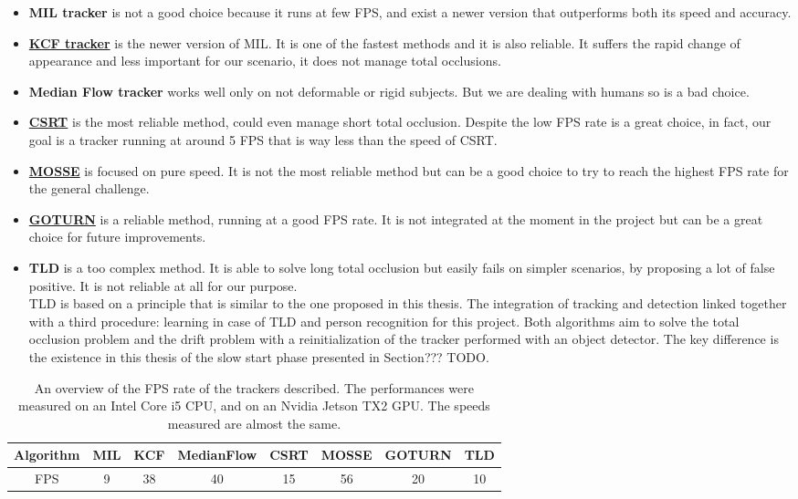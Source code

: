 \begin{itemize}
	\item \textbf{MIL tracker} is not a good choice because it runs at few FPS, and exist a newer version that outperforms both its speed and accuracy.
	\item \underline{\textbf{KCF tracker}} is the newer version of MIL. It is one of the fastest methods and it is also reliable. It suffers the rapid change of appearance and less important for our scenario, it does not manage total occlusions.
	\item \textbf{Median Flow tracker} works well only on not deformable or rigid subjects. But we are dealing with humans so is a bad choice.
	\item \underline{\textbf{CSRT}} is the most reliable method, could even manage short total occlusion. Despite the low FPS rate is a great choice, in fact, our goal is a tracker running at around 5 FPS that is way less than the speed of CSRT.
	\item \underline{\textbf{MOSSE}} is focused on pure speed. It is not the most reliable method but can be a good choice to try to reach the highest FPS rate for the general challenge.
	\item \underline{\textbf{GOTURN}} is a reliable method, running at a good FPS rate. It is not integrated at the moment in the project but can be a great choice for future improvements.
	\item \textbf{TLD} is a too complex method. It is able to solve long total occlusion but easily fails on simpler scenarios, by proposing a lot of false positive. It is not reliable at all for our purpose.\\
	TLD is based on a principle that is similar to the one proposed in this thesis. The integration of tracking and detection linked together with a third procedure: learning in case of TLD and person recognition for this project. Both algorithms aim to solve the total occlusion problem and the drift problem with a reinitialization of the tracker performed with an object detector. The key difference is the existence in this thesis of the slow start phase presented in Section??? TODO.
\end{itemize}

\begin{table}[]
	\centering
	\begin{tabular}{|c|c|c|c|c|c|c|c|}
		\hline
		Algorithm & MIL & KCF & MedianFlow & CSRT & MOSSE & GOTURN & TLD \\ \hline
		FPS  & 9   & 38  & 40         & 15   & 56    & 20     & 10  \\ \hline
	\end{tabular}
	\caption{An overview of the FPS rate of the trackers described. The performances were measured on an Intel Core i5 CPU, and on an Nvidia Jetson TX2 GPU. The speeds measured are almost the same.}
	\label{tab:trackersFPS}
\end{table}